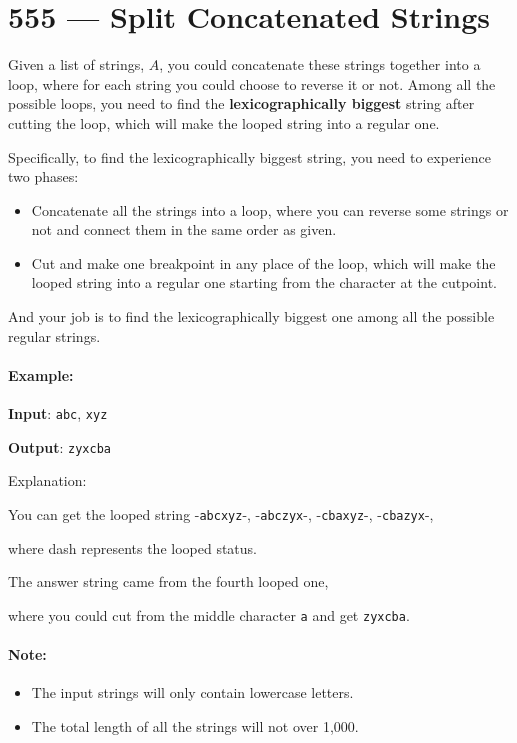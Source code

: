 \section{555 --- Split Concatenated Strings}
Given a list of strings, $A$, you could concatenate these strings together into a loop, where for each string you could choose to reverse it or not. Among all the possible loops, you need to find the \textbf{lexicographically biggest} string after cutting the loop, which will make the looped string into a regular one.

Specifically, to find the lexicographically biggest string, you need to experience two phases:

\begin{itemize}
\item Concatenate all the strings into a loop, where you can reverse some strings or not and connect them in the same order as given.
\item Cut and make one breakpoint in any place of the loop, which will make the looped string into a regular one starting from the character at the cutpoint.
\end{itemize}

And your job is to find the lexicographically biggest one among all the possible regular strings.

\paragraph{Example:}

\begin{flushleft}
\textbf{Input}: \texttt{abc}, \texttt{xyz}

\textbf{Output}: \texttt{zyxcba}

Explanation: 

You can get the looped string -\texttt{abcxyz}-, -\texttt{abczyx}-, -\texttt{cbaxyz}-, -\texttt{cbazyx}-, 

where dash represents the looped status. 

The answer string came from the fourth looped one, 

where you could cut from the middle character \texttt{a} and get \texttt{zyxcba}.
\end{flushleft}

\paragraph{Note:}

\begin{itemize}
\item The input strings will only contain lowercase letters.
\item The total length of all the strings will not over 1,000.
\end{itemize}

